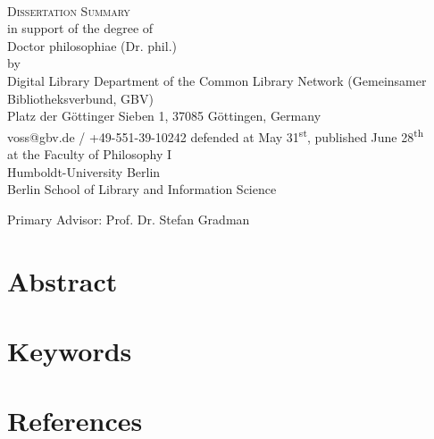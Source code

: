 \documentclass[
  12pt,twoside,BCOR=10mm
]{scrbook}
\begin{document}


\makeatletter
\begin{titlepage}
\begin{center}
\vfill
%
{\bfseries
  {\huge\strut\ignorespaces\@title}\\
  {\Large\strut\ignorespaces\@subtitle}
}
%
\baselineskip
%
\large
{\textsc{Dissertation Summary}}\\
in support of the degree of\\
Doctor philosophiae (Dr. phil.)\\
%
\baselineskip
%
by \@author\\
Digital Library Department of the Common Library Network (Gemeinsamer Bibliotheksverbund, GBV)\\
Platz der Göttinger Sieben 1, 37085 Göttingen, Germany\\
voss@gbv.de / +49-551-39-10242
%
\baselineskip
%
defended at May 31\textsuperscript{st},
published June 28\textsuperscript{th}\\
%
%
at the Faculty of Philosophy I\\
Humboldt-University Berlin\\
Berlin School of Library and Information Science\par
{}\baselineskip
Primary Advisor: Prof. Dr. Stefan Gradman 
\end{center}
\end{titlepage}
\makeatother


\section*{Abstract}


\section*{Keywords}


\clearpage



\onehalfspacing
\section*{References}
\printbibliography[heading=none]
\end{document}
